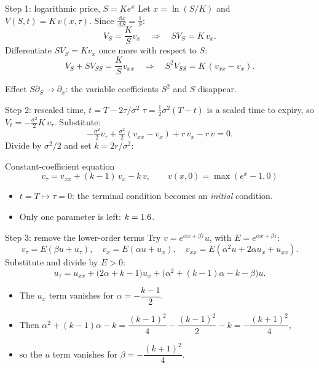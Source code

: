 \documentclass[11pt]{beamer}
\newcommand{\dd}{\,\mathrm d}
\begin{document}
\begin{frame}{Step 1: logarithmic price, $S=Ke^x$}
  Let $x=\ln(S/K)$ and $V(S,t)=K\,v(x,\tau)$. Since $\frac{\dd x}{\dd S}=\frac1S$:
  \[
    V_S=\frac{K}{S}v_x\quad\Rightarrow\quad SV_S=K\,v_x .
  \]
  Differentiate $SV_S=Kv_x$ once more with respect to $S$:
  \[
    V_S+SV_{SS}=\frac{K}{S}v_{xx}\quad\Rightarrow\quad S^2V_{SS}=K\,(v_{xx}-v_x).
  \]
  \begin{alertblock}{Effect}
    $S\partial_S\to\partial_x$: the variable coefficients $S^2$ and $S$ disappear.
  \end{alertblock}
\end{frame}

\begin{frame}{Step 2: rescaled time, $t=T-2\tau/\sigma^2$}
  $\tau=\tfrac12\sigma^2(T-t)$ is a scaled time to expiry, so $V_t=-\tfrac{\sigma^2}{2}K\,v_\tau$. Substitute:
  \[
    -\tfrac{\sigma^2}{2}v_\tau+\tfrac{\sigma^2}{2}(v_{xx}-v_x)+r\,v_x-r\,v=0 .
  \]
  Divide by $\sigma^2/2$ and set $k=2r/\sigma^2$:
  \begin{block}{Constant-coefficient equation}
    \[
      v_\tau=v_{xx}+(k-1)\,v_x-k\,v,\qquad v(x,0)=\max(e^x-1,0)
    \]
  \end{block}
  \begin{itemize}
    \item $t=T\mapsto\tau=0$: the terminal condition becomes an \emph{initial} condition.
    \item Only one parameter is left: $k=\num{1.6}$.
  \end{itemize}
\end{frame}

\begin{frame}{Step 3: remove the lower-order terms}
  Try $v=e^{\alpha x+\beta\tau}u$, with $E=e^{\alpha x+\beta\tau}$:
  \[
    v_\tau=E(\beta u+u_\tau),\quad v_x=E(\alpha u+u_x),\quad v_{xx}=E(\alpha^2u+2\alpha u_x+u_{xx}).
  \]
  Substitute and divide by $E>0$:
  \[
    u_\tau=u_{xx}+\big(2\alpha+k-1\big)u_x+\big(\alpha^2+(k-1)\alpha-k-\beta\big)u .
  \]
  \begin{itemize}
    \item The $u_x$ term vanishes for $\alpha=-\dfrac{k-1}{2}$.
    \item Then $\alpha^2+(k-1)\alpha-k=\dfrac{(k-1)^2}{4}-\dfrac{(k-1)^2}{2}-k=-\dfrac{(k+1)^2}{4}$,
    \item so the $u$ term vanishes for $\beta=-\dfrac{(k+1)^2}{4}$.
  \end{itemize}
\end{frame}
\end{document}
